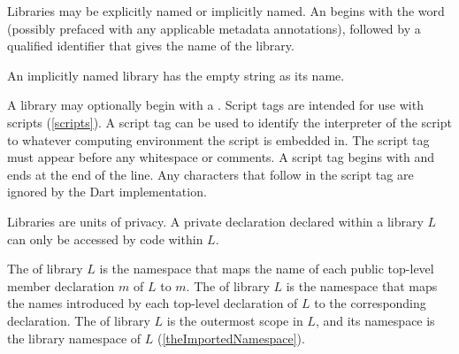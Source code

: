 \documentclass[makeidx]{article}
\begin{document}
{\LMHash{}%
Libraries may be explicitly named or implicitly named.
An  begins with the word \LIBRARY{}
(possibly prefaced with any applicable metadata annotations),
followed by a qualified identifier that gives the name of the library.


\LMHash{}%
An implicitly named library has the empty string as its name.



\LMHash{}%
A library may optionally begin with a .
Script tags are intended for use with scripts (\ref{scripts}).
A script tag can be used to identify the interpreter of the script to
whatever computing environment the script is embedded in.
The script tag must appear before any whitespace or comments.
A script tag begins with \lit{\#!} and ends at the end of the line.
Any characters that follow \lit{\#!} in the script tag are ignored by
the Dart implementation.

\LMHash{}%
Libraries are units of privacy.
A private declaration declared within a library $L$
can only be accessed by code within $L$.


\LMHash{}%
The  of library $L$ is the namespace that maps
the name of each public top-level member declaration $m$ of $L$ to $m$.
The  of library $L$ is the namespace that maps
the names introduced by each top-level declaration of $L$
to the corresponding declaration.
The  of library $L$ is the outermost scope in $L$,
and its namespace is the library namespace of $L$
(\ref{theImportedNamespace}).

}
\end{document}
